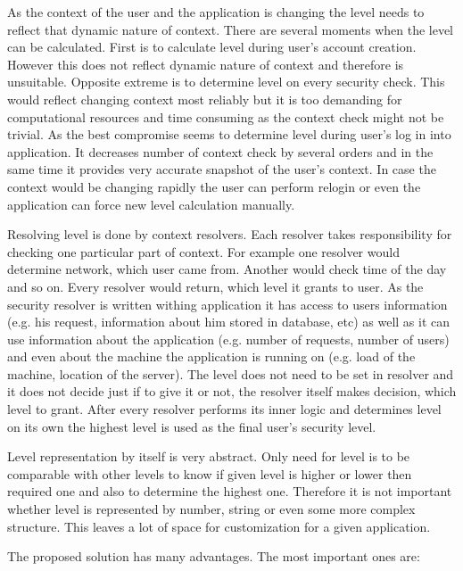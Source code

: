 \documentclass{poster15}
\begin{document}
As the context of the user and the application is changing the level needs to reflect that dynamic nature of context. There are several moments when the level can be calculated. First is to calculate level during user's account creation. However this does not reflect dynamic nature of context and therefore is unsuitable. Opposite extreme is to determine level on every security check. This would reflect changing context most reliably but it is too demanding for computational resources and time consuming as the context check might not be trivial. As the best compromise seems to determine level during user's log in into application. It decreases number of context check by several orders and in the same time it provides very accurate snapshot of the user's context. In case the context would be changing rapidly the user can perform relogin or even the application can force new level calculation manually.

Resolving level is done by context resolvers. Each resolver takes responsibility for checking one particular part of context. For example one resolver would determine network, which user came from. Another would check time of the day and so on. Every resolver would return, which level it grants to user. As the security resolver is written withing application it has access to users information (e.g. his request, information about him stored in database, etc) as well as it can use information about the application (e.g. number of requests, number of users) and even about the machine the application is running on (e.g. load of the machine, location of the server). The level does not need to be set in resolver and it does not decide just if to give it or not, the resolver itself makes decision, which level to grant. After every resolver performs its inner logic and determines level on its own the highest level is used as the final user's security level.

Level representation by itself is very abstract. Only need for level is to be comparable with other levels to know if given level is higher or lower then required one and also to determine the highest one. Therefore it is not important whether level is represented by number, string or even some more complex structure. This leaves a lot of space for customization for a given application.

The proposed solution has many advantages. The most important ones are:
\end{document}
